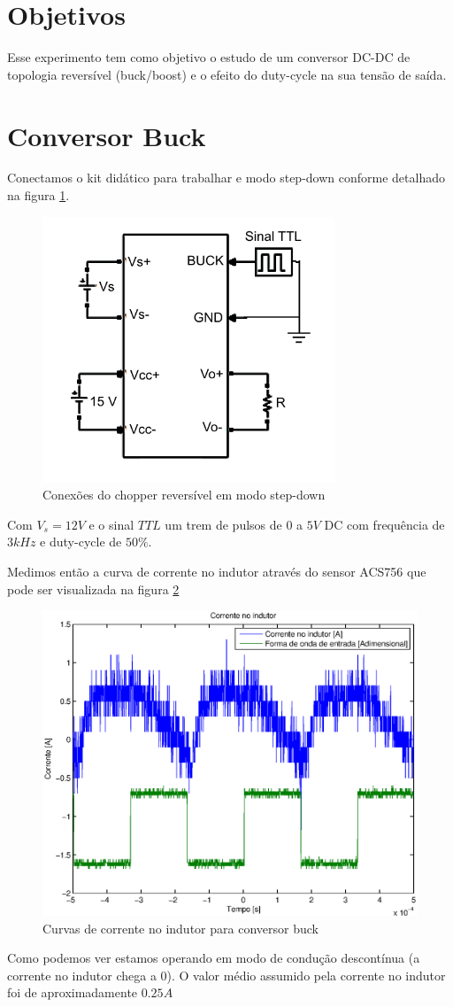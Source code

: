 \documentclass{article}
\begin{document}


\onehalfspacing
\section{Objetivos}
	Esse experimento tem como objetivo o estudo de um conversor DC-DC de topologia reversível (buck/boost) e o efeito do duty-cycle na sua tensão de saída.

\section{Conversor Buck}
Conectamos o kit didático para trabalhar e modo step-down conforme detalhado na figura \ref{fig:buesq}.
\begin{figure}[H]
	\centering
	\includegraphics[width=0.5\linewidth]{Dados/buck/esq}
	\caption{Conexões do chopper reversível em modo step-down \cite{bb:paiva}}
	\label{fig:buesq}
\end{figure}
Com $V_s = 12V$ e o sinal $TTL$ um trem de pulsos de $0$ a $5V$ DC com frequência de $3kHz$ e duty-cycle de $50\%$.

Medimos então a curva de corrente no indutor através do sensor ACS756 que pode ser visualizada na figura \ref{fig:buil}
\begin{figure}[H]
	\centering
	\includegraphics[width=0.5\linewidth]{Dados/buck/il}
	\caption{Curvas de corrente no indutor para conversor buck}
	\label{fig:buil}
\end{figure}
Como podemos ver estamos operando em modo de condução descontínua (a corrente no indutor chega a 0). O valor médio assumido pela corrente no indutor foi de aproximadamente $0.25 A$
\end{document}
